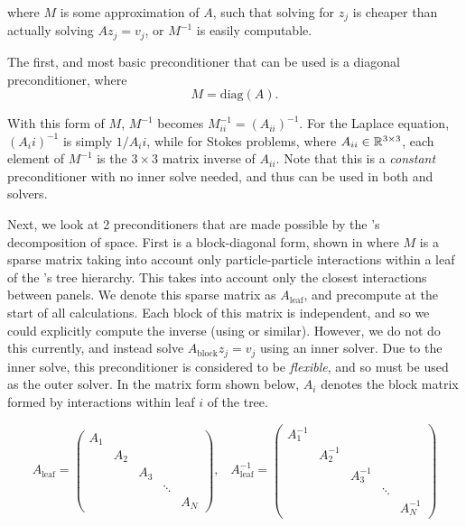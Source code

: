 \noindent
where $M$ is some approximation of $A$, such that solving for $z_j$ is cheaper than actually solving $Az_j = v_j$, or $M^{-1}$ is easily computable.

The first, and most basic preconditioner that can be used is a diagonal preconditioner, where
\begin{equation}
	M = \text{diag}(A).
\end{equation}

With this form of $M$, $M^{-1}$ becomes $M^{-1}_{ii} = (A_{ii})^{-1}$. For the Laplace equation, $(A_ii)^{-1}$ is simply $1 / A_ii$, while for Stokes problems, where $A_{ii} \in \mathbb{R}^{3\times 3}$, each element of $M^{-1}$ is the $3\times3$ matrix inverse of $A_{ii}$. Note that this is a \emph{constant} preconditioner with no inner solve needed, and thus can be used in both {\gmres} and {\fgmres} solvers.

Next, we look at 2 preconditioners that are made possible by the {\fmm}'s decomposition of space. First is a block-diagonal form, shown in \cite{Liu2009} where $M$ is a sparse matrix taking into account only particle-particle interactions within a leaf of the {\fmm}'s tree hierarchy. This takes into account only the closest interactions between panels. We denote this sparse matrix as $A_{\text{leaf}}$, and precompute at the start of all calculations. Each block of this matrix is independent, and so we could explicitly compute the inverse (using {\blas} or similar). However, we do not do this currently, and instead solve $A_{\text{block}}z_j = v_j$ using an inner {\gmres} solver. Due to the inner solve, this preconditioner is considered to be \emph{flexible}, and so {\fgmres} must be used as the outer solver. In the matrix form shown below, $A_i$ denotes the block matrix formed by interactions within leaf $i$ of the tree.

\begin{equation} A_{\text{leaf}} = 
\left(\begin{array}{ccccc}
	A_1 &   &   &   &   \\
	  & A_2 &   &   &   \\
	  &   & A_3 &   &   \\
	  &   &   & \ddots &   \\
	  &   &   &   & A_N
\end{array}\right),\;\;\;
A_{\text{leaf}}^{-1} = 
\left(\begin{array}{ccccc}
	A_1^{-1} &   &   &   &   \\
	  & A_2^{-1} &   &   &   \\
	  &   & A_3^{-1} &   &   \\
	  &   &   & \ddots &   \\
	  &   &   &   & A_N^{-1}
\end{array}\right)
\end{equation}

